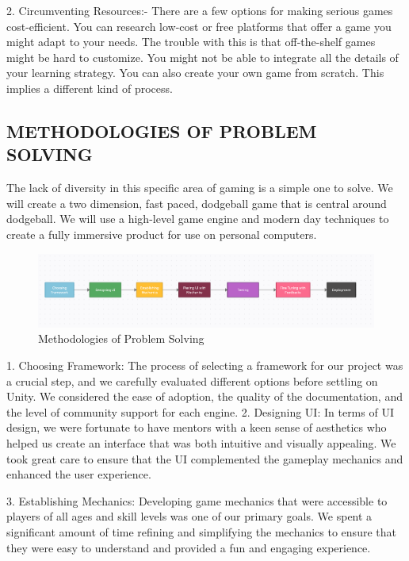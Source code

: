 \documentclass[12pt]{report}
\begin{document}
2. Circumventing Resources:- There are a few options for making serious games cost-efficient. You can research low-cost or free platforms that offer a game you might adapt to your needs. The trouble with this is that off-the-shelf games might be hard to customize. You might not be able to integrate all the details of your learning strategy. You can also create your own game from scratch. This implies a different kind of process. 

\raggedright
\subsection{METHODOLOGIES OF PROBLEM SOLVING}
\justifying
\setlength{\parindent}{2em}
\setlength{\parskip}{0.5em}
\renewcommand{\baselinestretch}{1.5}
\normalsize \hspace{1.7cm}The lack of diversity in this specific area of gaming is a simple one to solve. We will create a two
dimension, fast paced, dodgeball game that is central around dodgeball. We will use a high-level game engine and modern day techniques to create a fully immersive product for use on personal computers.

\setlength{\parindent}{0em}
\setlength{\parskip}{0em}
\begin{figure}[h]
   \includegraphics[scale=0.45]{SDLC.png}
   \caption{Methodologies of Problem Solving}
   \label{Methodologies of Problem Solving}
\end{figure}

1.	Choosing Framework: The process of selecting a framework for our project was a crucial step, and we carefully evaluated different options before settling on Unity. We considered the ease of adoption, the quality of the documentation, and the level of community support for each engine.
2.	Designing UI: In terms of UI design, we were fortunate to have mentors with a keen sense of aesthetics who helped us create an interface that was both intuitive and visually appealing. We took great care to ensure that the UI complemented the gameplay mechanics and enhanced the user experience.

3.	Establishing Mechanics: Developing game mechanics that were accessible to players of all ages and skill levels was one of our primary goals. We spent a significant amount of time refining and simplifying the mechanics to ensure that they were easy to understand and provided a fun and engaging experience.
\end{document}
